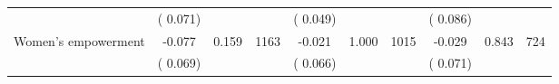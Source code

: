 \begin{tabular}{l*{9}{c}}
                               &        (       0.071) & &                                                                &       (       0.049) & &                                                         &       (       0.086) & & \\ 
 Women's empowerment                &             -0.077        &        0.159 & 1163        &             -0.021 &        1.000 & 1015               &       -0.029 &        0.843 & 724       \\ 
                               &        (       0.069) & &                                                                &       (       0.066) & &                                                         &       (       0.071) & & \\ 
\hline \end{tabular}                                                                                                                                                      